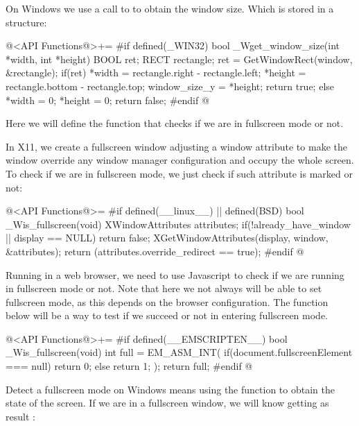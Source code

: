
On Windows we use a call to  to obtain the
window size. Which is stored in a  structure:

\iniciocodigo
@<API Functions@>+=
#if defined(_WIN32)
bool _Wget_window_size(int *width, int *height){
  BOOL ret;
  RECT rectangle;
  ret = GetWindowRect(window, &rectangle);
  if(ret){
    *width = rectangle.right - rectangle.left;
    *height = rectangle.bottom - rectangle.top;
    window_size_y = *height;
    return true;
  }
  else{
    *width = 0;
    *height = 0;
    return false;
  }
}
#endif
@
\fimcodigo


Here we will define the function that checks if we are in fullscreen
mode or not.


In X11, we create a fullscreen window adjusting a window attribute to
make the window override any window manager configuration and occupy
the whole screen. To check if we are in fullscreen mode, we just check
if such attribute is marked or not:

\iniciocodigo
@<API Functions@>=
#if defined(__linux__) || defined(BSD)
bool _Wis_fullscreen(void){
  XWindowAttributes attributes;
  if(!already_have_window || display == NULL)
    return false;
  XGetWindowAttributes(display, window, &attributes);
  return (attributes.override_redirect == true);
}
#endif
@


Running in a web browser, we need to use Javascript to check if we are
running in fullscreen mode or not. Note that here we not always will
be able to set fullscreen mode, as this depends on the browser
configuration. The function below will be a way to test if we succeed
or not in entering fullscreen mode.

\iniciocodigo
@<API Functions@>+=
#if defined(__EMSCRIPTEN__)
bool _Wis_fullscreen(void){
  int full = EM_ASM_INT({
    if(document.fullscreenElement === null){
      return 0;
    } else{
      return 1;
    }
  });
  return full;
}
#endif
@


Detect a fullscreen mode on Windows means using the
function  to obtain the state
of the screen. If we are in a fullscreen window, we will know getting
as result :

